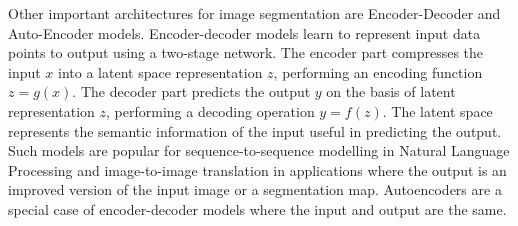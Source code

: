 \documentclass[a4paper,twoside,12pt]{book}
\begin{document}
Other important architectures for image segmentation are Encoder-Decoder and Auto-Encoder models. Encoder-decoder models learn to represent input data points to output using a two-stage network. The encoder part compresses the input $x$ into a latent space representation $z$, performing an encoding function $z = g(x)$. The decoder part predicts the output $y$ on the basis of latent representation $z$, performing a decoding operation $y = f(z)$. The latent space represents the semantic information of the input useful in predicting the output. Such models are popular for sequence-to-sequence modelling in Natural Language Processing and image-to-image translation in applications where the output is an improved version of the input image or a segmentation map. Autoencoders are a special case of encoder-decoder models where the input and output are the same.
\end{document}
